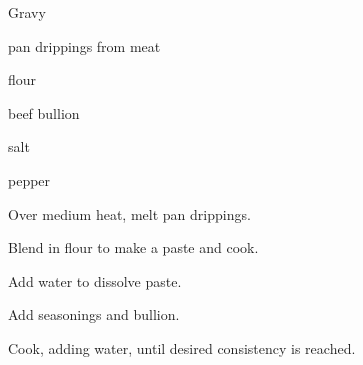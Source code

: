 \begin{recipe}{Gravy}{}{}

\begin{ingredients}
\item pan drippings from meat
\item {} flour
\item beef bullion
\item salt
\item pepper
\end{ingredients}

\begin{directions}
\item Over medium heat, melt pan drippings.
\item Blend in flour to make a paste and cook.
\item Add water to dissolve paste.
\item Add seasonings and bullion.
\item Cook, adding water, until desired consistency is reached.
\end{directions}

\end{recipe}
